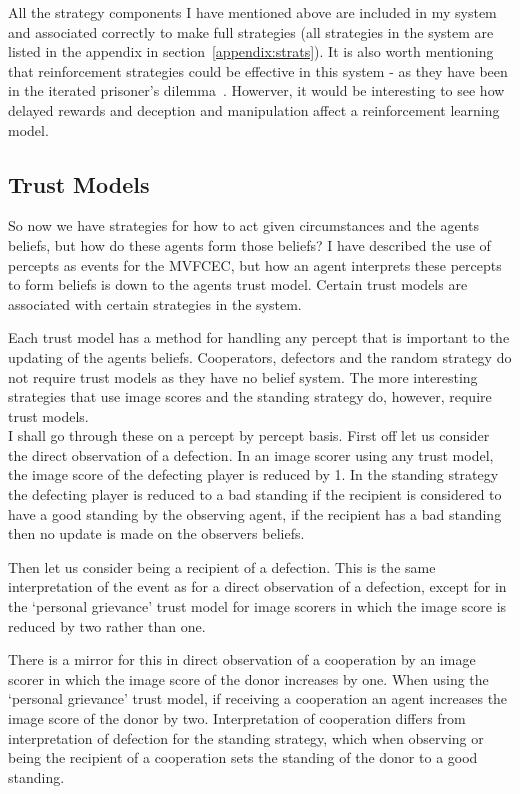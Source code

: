\documentclass[]{final_report}
\begin{document}
All the strategy components I have mentioned above are included in my system and associated correctly to make full strategies (all strategies in the system are listed in the appendix in section~\ref{appendix:strats}). It is also worth mentioning that reinforcement strategies could be effective in this system - as they have been in the iterated prisoner's dilemma~\cite{harper2017reinforcement}. Howerver, it would be interesting to see how delayed rewards and deception and manipulation affect a reinforcement learning model.

\subsection{Trust Models}
\label{subs:trustm}
So now we have strategies for how to act given circumstances and the agents beliefs, but how do these agents form those beliefs? I have described the use of percepts as events for the MVFCEC, but how an agent interprets these percepts to form beliefs is down to the agents trust model. Certain trust models are associated with certain strategies in the system.\par
Each trust model has a method for handling any percept that is important to the updating of the agents beliefs. Cooperators, defectors and the random strategy do not require trust models as they have no belief system. The more interesting strategies that use image scores and the standing strategy do, however, require trust models.\\
I shall go through these on a percept by percept basis. First off let us consider the direct observation of a defection. In an image scorer using any trust model, the image score of the defecting player is reduced by 1. In the standing strategy the defecting player is reduced to a bad standing if the recipient is considered to have a good standing by the observing agent, if the recipient has a bad standing then no update is made on the observers beliefs.\par
Then let us consider being a recipient of a defection. This is the same interpretation of the event as for a direct observation of a defection, except for in the `personal grievance' trust model for image scorers in which the image score is reduced by two rather than one.\par
There is a mirror for this in direct observation of a cooperation by an image scorer in which the image score of the donor increases by one. When using the `personal grievance' trust model, if receiving a cooperation an agent increases the image score of the donor by two. Interpretation of cooperation differs from interpretation of defection for the standing strategy, which when observing or being the recipient of a cooperation sets the standing of the donor to a good standing.\par
\end{document}
